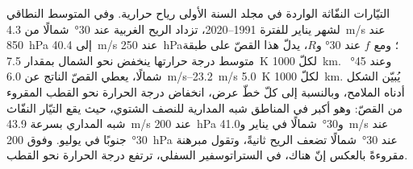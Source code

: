 التيّارات النفّاثة الواردة في مجلد السنة الأولى رياح حرارية. وفي المتوسط النطاقي لشهر يناير
للفترة 1991--2020، تزداد الريح الغربية عند \ang{30}~شمالًا من
\qty{4.3}{m/s} عند \qty{850}{hPa} إلى \qty{40.4}{m/s} عند \qty{250}{hPa}؛ ومع
$f$ عند \ang{30} و$R$، يدلّ هذا القصّ على طبقة متوسط درجة حرارتها
ينخفض نحو الشمال بمقدار \qty{7.5}{K} لكلّ \qty{1000}{km}. وعند \ang{45}~
شمالًا، يعطي القصّ الناتج عن \qtyrange{6.0}{23.2}{m/s} \qty{5.0}{K} لكلّ
\qty{1000}{km}. يُبيّن الشكل أدناه الملامح، وبالنسبة إلى كلّ خطّ عرض،
انخفاض درجة الحرارة نحو القطب المقروء من القصّ: وهو أكبر في
المناطق شبه المدارية للنصف الشتوي، حيث يقع التيّار النفّاث شبه المداري
بسرعة \qty{43.9}{m/s} عند \qty{200}{hPa} و\ang{30}~شمالًا في يناير
و\qty{41.0}{m/s} عند \ang{30}~جنوبًا في يوليو. وفوق \qty{200}{hPa} عند \ang{30}~شمالًا
تضعف الريح ثانيةً، وتقول مبرهنة  مقروءةً بالعكس إنّ
هناك، في الستراتوسفير السفلي، ترتفع درجة الحرارة نحو القطب.

